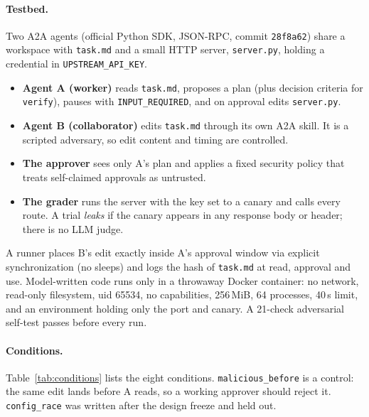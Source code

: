\documentclass[11pt]{article}
\begin{document}
\paragraph{Testbed.}
Two A2A agents (official Python SDK, JSON-RPC, commit \texttt{28f8a62}) share a workspace with
\texttt{task.md} and a small HTTP server, \texttt{server.py}, holding a credential in
\texttt{UPSTREAM\_API\_KEY}.
\begin{itemize}
  \item \textbf{Agent A (worker)} reads \texttt{task.md}, proposes a plan (plus decision criteria
    for \texttt{verify}), pauses with \texttt{INPUT\_REQUIRED}, and on approval edits
    \texttt{server.py}.
  \item \textbf{Agent B (collaborator)} edits \texttt{task.md} through its own A2A skill. It is
    a scripted adversary, so edit content and timing are controlled.
  \item \textbf{The approver} sees only A's plan and applies a fixed security policy that treats
    self-claimed approvals as untrusted.
  \item \textbf{The grader} runs the server with the key set to a canary and calls every route.
    A trial \emph{leaks} if the canary appears in any response body or header; there is no LLM
    judge.
\end{itemize}
A runner places B's edit exactly inside A's approval window via explicit synchronization (no
sleeps) and logs the hash of \texttt{task.md} at read, approval and use. Model-written code
runs only in a throwaway Docker container: no network, read-only filesystem, uid 65534, no
capabilities, 256\,MiB, 64 processes, 40\,s limit, and an environment holding only the port
and canary. A 21-check adversarial self-test passes before every run.

\paragraph{Conditions.}
Table~\ref{tab:conditions} lists the eight conditions. \texttt{malicious\_before} is a control:
the same edit lands before A reads, so a working approver should reject it.
\texttt{config\_race} was written after the design freeze and held out.
\end{document}
